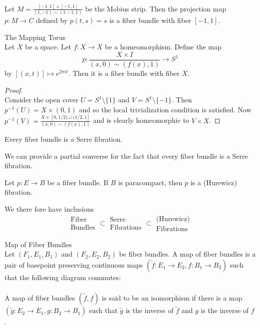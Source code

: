\documentclass[a4paper]{article}
\begin{document}
\begin{eg}{}{}\\
Let $M=\frac{[-1,1]\times[-1,1]}{(t,-1)\sim(1-t,1)}$ be the Mobius strip. Then the projection map $p:M\to C$ defined by $p(t,s)=s$ is a fiber bundle with fiber $[-1,1]$. 
\end{eg}

\begin{eg}{The Mapping Torus}{}\\
Let $X$ be a space. Let $f:X\to X$ be a homeomorphism. Define the map $$p:\frac{X\times I}{(x,0)\sim(f(x),1)}\to S^1$$ by $[(x,t)]\mapsto e^{2\pi it}$. Then it is a fiber bundle with fiber $X$. 
\begin{proof}\\
Consider the open cover $U=S^1\setminus\{1\}$ and $V=S^1\setminus\{-1\}$. Then $p^{-1}(U)=X\times(0,1)$ and so the local trivialization condition is satisfied. Now $p^{-1}(V)=\frac{X\times[0,1/2)\cup(1/2,1]}{(x,0)\sim(f(x),1)}$ and is clearly homeomorphic to $V\times X$. 
\end{proof}
\end{eg}

\begin{prp}{}{} Every fiber bundle is a Serre fibration. 
\end{prp}

We can provide a partial converse for the fact that every fiber bundle is a Serre fibration. 

\begin{prp}{}{} Let $p:E\to B$ be a fiber bundle. If $B$ is paracompact, then $p$ is a (Hurewicz) fibration. 
\end{prp}

We there fore have inclusions $$\substack{\text{Fiber}\\\text{Bundles}}\subset\substack{\text{Serre}\\\text{Fibrations}}\subset\substack{\text{(Hurewicz)}\\\text{Fibrations}}$$

\begin{defn}{Map of Fiber Bundles}{}\\
Let $(F_1,E_1,B_1)$ and $(F_2,E_2,B_2)$ be fiber bundles. A map of fiber bundles is a pair of basepoint preserving continuous maps $(\tilde{f}:E_1\to E_2,f:B_1\to B_2)$ such that the following diagram commutes: \\
\\
A map of fiber bundles $(\tilde{f},f)$ is said to be an isomorphism if there is a map $(\tilde{g}:E_2\to E_1,g:B_2\to B_1)$ such that $\tilde{g}$ is the inverse of $\tilde{f}$ and $g$ is the inverse of $f$. 
\end{defn}
\end{document}
